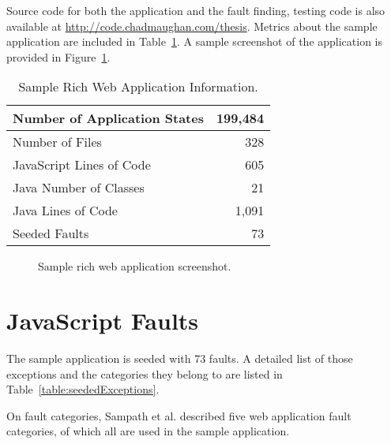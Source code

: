 Source code for both the application and the fault finding, testing code is also available at \url{http://code.chadmaughan.com/thesis}.  Metrics about the sample application are included in Table~\ref{table:sampleAppInfo}.  A sample screenshot of the application is provided in Figure~\ref{fig:screenshot}.

\begin{table}[h]
	\centering
	\caption{Sample Rich Web Application Information.}
	\begin{tabular}{| l | r|}
		\hline
Number of Application States		& 199,484 	\\ \hline
Number of Files				& 328 		\\ \hline
JavaScript Lines of Code			& 605 		\\ \hline
Java Number of Classes			& 21 		\\ \hline
Java Lines of Code				& 1,091 		\\ \hline
Seeded Faults					& 73 		\\ \hline
	\end{tabular}
\label{table:sampleAppInfo}
\end{table}

\begin{figure}[htbp]
\centering
\caption{Sample rich web application screenshot.}
\label{fig:screenshot}
\end{figure}

\section{JavaScript Faults}
The sample application is seeded with 73 faults.  A detailed list of those exceptions and the categories they belong to are listed in Table~\ref{table:seededExceptions}.  

On fault categories, Sampath et al. described five web application fault categories\cite{sampath2007applying}, of which all are used in the sample application.

